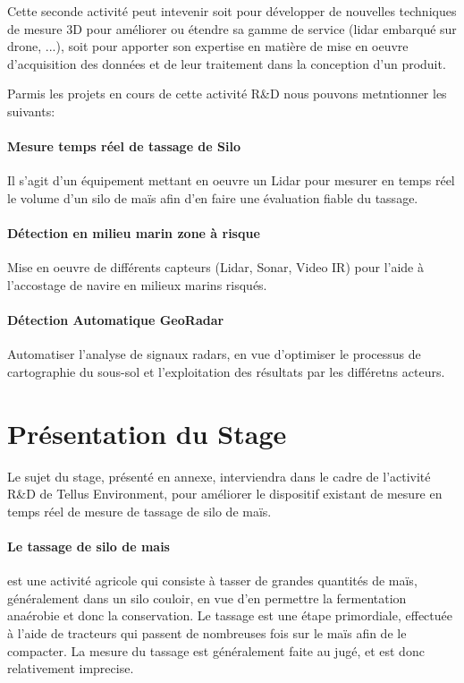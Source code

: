 \documentclass[12pt,a4paper]{report}
\begin{document}
Cette seconde activité peut intevenir soit pour développer de nouvelles techniques de mesure 3D pour améliorer ou étendre sa gamme de service (lidar embarqué sur drone, ...), soit pour apporter son expertise en matière de mise en oeuvre d'acquisition des données et de leur traitement dans la conception d'un produit.

Parmis les projets en cours de cette activité R\&D nous pouvons metntionner les suivants:


\paragraph{Mesure temps réel de tassage de Silo} Il s'agit d'un équipement mettant en oeuvre un Lidar pour mesurer en temps réel le volume d'un silo de maïs afin d'en faire une évaluation fiable du tassage.

\paragraph{Détection en milieu marin zone à risque} Mise en oeuvre de différents capteurs  (Lidar, Sonar, Video IR) pour l'aide à l'accostage de navire en milieux marins risqués.

\paragraph{Détection Automatique GeoRadar} Automatiser l'analyse de signaux radars, en vue d'optimiser le processus de cartographie du sous-sol et l'exploitation des résultats par les différetns acteurs.

\section{Présentation du Stage}
Le sujet du stage, présenté en annexe, interviendra dans le cadre de l'activité R\&D de Tellus Environment, pour améliorer le dispositif existant de mesure en temps réel de mesure de tassage de silo de maïs.

\paragraph{Le tassage de silo de mais} est une activité agricole qui consiste à  tasser de grandes quantités de maïs, généralement dans un silo couloir, en vue d'en permettre la fermentation anaérobie et donc la conservation. Le tassage est une étape primordiale, effectuée à l'aide de tracteurs qui passent de nombreuses fois sur le maïs afin de le compacter. La mesure du tassage est généralement faite au jugé, et est donc relativement imprecise.
\end{document}
